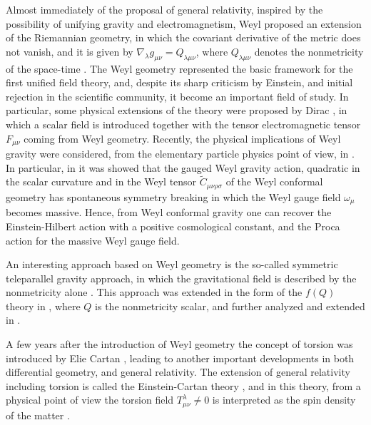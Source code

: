 \documentclass[aps,superscriptaddress, showpacs,preprintnumbers, superscriptaddress, nofootinbibt,twocolumn]{revtex4-2}
\begin{document}
Almost immediately of the proposal of general relativity, inspired by the possibility of unifying gravity and electromagnetism, Weyl proposed an extension of the Riemannian geometry,  in which the covariant derivative of the metric does not vanish, and it is given by $\nabla _{\lambda}g_{\mu \nu}=Q_{\lambda \mu \nu}$, where $Q_{\lambda \mu \nu}$ denotes the nonmetricity of the space-time \cite{r5}. The Weyl geometry represented the basic framework for the first unified field theory, and, despite its sharp criticism by Einstein, and initial rejection in the scientific community, it become an important field of study. In particular, some physical extensions of the theory were proposed by Dirac \cite{W1,W2}, in which a scalar field is introduced together with the tensor electromagnetic tensor $F_{\mu \nu}$ coming from Weyl geometry. Recently, the physical implications of Weyl gravity were considered, from the elementary particle physics point of view, in \cite{Gh1,Gh2,Gh3,Gh4,Gh5,Gh6,Gh7}. In particular, in \cite{Gh1} it was showed that the gauged Weyl gravity action, quadratic in the scalar curvature and in the Weyl tensor ${\tilde{C}}_{\mu \nu  \rho \sigma}$ of the Weyl conformal geometry has spontaneous symmetry breaking in which the Weyl gauge field $\omega _{\mu}$ becomes massive. Hence, from Weyl conformal gravity one can recover the Einstein-Hilbert action with a positive cosmological constant, and the Proca action for the massive Weyl gauge field.

An interesting approach based on Weyl geometry is the so-called symmetric teleparallel gravity approach, in which the gravitational field is described by the nonmetricity alone \cite{Nester}. This approach was extended in the form of the $f(Q)$ theory in \cite{Q1}, where $Q$ is the nonmetricity scalar, and further analyzed and extended in \cite{Q2,Q3,Q4,Q5,Q6,Q7, Q8,Q9}.

 A few years after the introduction of Weyl geometry the concept of torsion was introduced by Elie Cartan \cite{r6}, leading to another important developments in both differential geometry, and general relativity. The extension of general relativity including torsion is called
the Einstein-Cartan theory \cite{r7,r8,r9}, and in this theory, from a physical point
of view  the torsion field $T_{\mu \nu}^{\lambda}\neq 0$ is interpreted as the spin density of the matter \cite{r10}.
\end{document}
